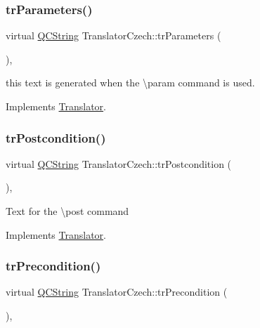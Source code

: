 \mbox{\label{class_translator_czech_a843873a1fd5080a9d2ea62597c288061}} 
\subsubsection{\texorpdfstring{trParameters()}{trParameters()}}
{\footnotesize\ttfamily virtual \mbox{\hyperlink{class_q_c_string}{Q\+C\+String}} Translator\+Czech\+::tr\+Parameters (\begin{DoxyParamCaption}{ }\end{DoxyParamCaption})\hspace{0.3cm}{\ttfamily [inline]}, {\ttfamily [virtual]}}

this text is generated when the \textbackslash{}param command is used. 

Implements \mbox{\hyperlink{class_translator}{Translator}}.

\mbox{\label{class_translator_czech_add92570f81b2876cbaa356d23a6d91ab}} 
\subsubsection{\texorpdfstring{trPostcondition()}{trPostcondition()}}
{\footnotesize\ttfamily virtual \mbox{\hyperlink{class_q_c_string}{Q\+C\+String}} Translator\+Czech\+::tr\+Postcondition (\begin{DoxyParamCaption}{ }\end{DoxyParamCaption})\hspace{0.3cm}{\ttfamily [inline]}, {\ttfamily [virtual]}}

Text for the \textbackslash{}post command 

Implements \mbox{\hyperlink{class_translator}{Translator}}.

\mbox{\label{class_translator_czech_a30c061bb96ca53fcd82120c2e95fc0b3}} 
\subsubsection{\texorpdfstring{trPrecondition()}{trPrecondition()}}
{\footnotesize\ttfamily virtual \mbox{\hyperlink{class_q_c_string}{Q\+C\+String}} Translator\+Czech\+::tr\+Precondition (\begin{DoxyParamCaption}{ }\end{DoxyParamCaption})\hspace{0.3cm}{\ttfamily [inline]}, {\ttfamily [virtual]}}

